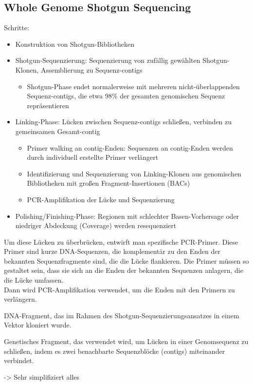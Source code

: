 \subsection{Whole Genome Shotgun Sequencing} 
Schritte:
\begin{itemize}
    \item Konstruktion von Shotgun-Bibliotheken
    \item Shotgun-Sequenzierung: Sequenzierung von zufällig gewählten Shotgun-Klonen, Assemblierung zu Sequenz-\glspl{contig} 
    \begin{itemize}
        \item Shotgun-Phase endet normalerweise mit mehreren nicht-überlappenden Sequenz-\glspl{contig}, die etwa 98\% der gesamten genomischen Sequenz repräsentieren
    \end{itemize}
    \item Linking-Phase: Lücken zwischen Sequenz-\glspl{contig} schließen, verbinden zu gemeinsamen Gesamt-\gls{contig}
    \begin{itemize}
        \item Primer walking an \gls{contig}-Enden: Sequenzen an \gls{contig}-Enden werden durch individuell erstellte Primer verlängert
        \item Identifizierung und Sequenzierung von Linking-Klonen aus genomischen Bibliotheken mit großen Fragment-Insertionen (BACs)
        \item PCR-Amplifikation der Lücke und Sequenzierung
    \end{itemize}
    \item Polishing/Finishing-Phase: Regionen mit schlechter Basen-Vorhersage oder niedriger Abdeckung (Coverage) werden resequenziert  
\end{itemize}

\begin{mybox}[title=Wie PCR-amplifiziert man Lücken?]
Um diese Lücken zu überbrücken, entwirft man spezifische PCR-Primer. Diese Primer sind kurze DNA-Sequenzen, die komplementär zu den Enden der bekannten Sequenzfragmente sind, die die Lücke flankieren. Die Primer müssen so gestaltet sein, dass sie sich an die Enden der bekannten Sequenzen anlagern, die die Lücke umfassen. \\
Dann wird PCR-Amplifikation verwendet, um die Enden mit den Primern zu verlängern. 
\end{mybox}
\begin{mybox}[title=Definition Shotgun-Klon]
DNA-Fragment, das im Rahmen des Shotgun-Sequenzierungsansatzes in einem Vektor kloniert wurde. 
\end{mybox}
\begin{mybox}[title=Definition Linking-Klon]
Genetisches Fragment, das verwendet wird, um Lücken in einer Genomsequenz zu schließen, indem es zwei benachbarte Sequenzblöcke (\glspl{contig}) miteinander verbindet. 
\end{mybox}
-> Sehr simplifiziert alles

